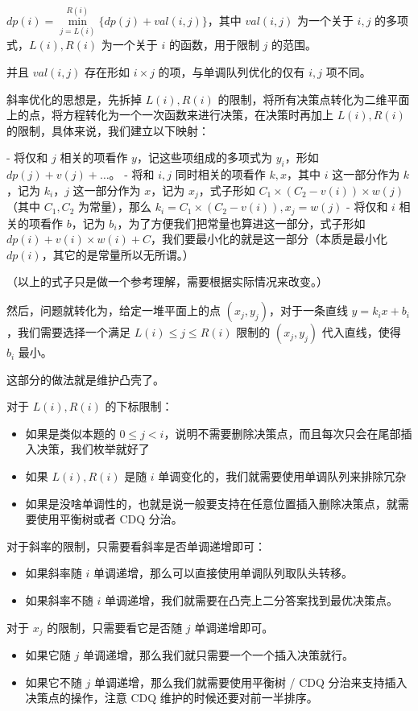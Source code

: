 \documentclass[titlepage, a4paper]{article}
\begin{document}
\begin{multicols}{2}
\begin{spacing}{0.6}
			 		$dp(i) = \min\limits_{j = L(i)}^{R(i)}\{dp(j) + val(i, j)\}$，其中 $val(i, j)$ 为一个关于 $i, j$ 的多项式，$L(i), R(i)$ 为一个关于 $i$ 的函数，用于限制 $j$ 的范围。
			 		
			 		并且 $val(i, j)$ 存在形如 $i \times j$ 的项，与单调队列优化的仅有 $i, j$ 项不同。
			 		
			 		斜率优化的思想是，先拆掉 $L(i), R(i)$ 的限制，将所有决策点转化为二维平面上的点，将方程转化为一个一次函数来进行决策，在决策时再加上 $L(i), R(i)$ 的限制，具体来说，我们建立以下映射：
			 		
			 		- 将仅和 $j$ 相关的项看作 $y$，记这些项组成的多项式为 $y_i$，形如 $dp(j) + v(j) + \dots$。
			 		- 将和 $i,j$ 同时相关的项看作 $k,x$，其中 $i$ 这一部分作为 $k$，记为 $k_i$，$j$ 这一部分作为 $x$，记为 $x_j$，式子形如 $C_1\times(C_2 - v(i)) \times w(j)$（其中 $C_1,C_2$ 为常量），那么 $k_i = C_1\times(C_2 - v(i)), x_j = w(j)$
			 		- 将仅和 $i$ 相关的项看作 $b$，记为 $b_i$，为了方便我们把常量也算进这一部分，式子形如 $dp(i) + v(i) \times w(i) + C$，我们要最小化的就是这一部分（本质是最小化 $dp(i)$，其它的是常量所以无所谓。）
			 		
			 		（以上的式子只是做一个参考理解，需要根据实际情况来改变。）
			 		
			 		然后，问题就转化为，给定一堆平面上的点 $(x_j, y_j)$，对于一条直线 $y = k_ix + b_i$，我们需要选择一个满足 $L(i) \le j \le R(i)$ 限制的 $(x_j, y_j)$ 代入直线，使得 $b_i$ 最小。
			 		
			 		这部分的做法就是维护凸壳了。
			 		
			 		对于 $L(i), R(i)$ 的下标限制：
			 		\begin{itemize}
			 			\item 如果是类似本题的 $0 \le j < i$，说明不需要删除决策点，而且每次只会在尾部插入决策，我们枚举就好了
			 			\item 如果 $L(i), R(i)$ 是随 $i$ 单调变化的，我们就需要使用单调队列来排除冗杂
			 			\item 如果是没啥单调性的，也就是说一般要支持在任意位置插入删除决策点，就需要使用平衡树或者 CDQ 分治。
			 		\end{itemize}
			 		对于斜率的限制，只需要看斜率是否单调递增即可：
			 		\begin{itemize}
			 			\item 如果斜率随 $i$ 单调递增，那么可以直接使用单调队列取队头转移。
			 			\item 如果斜率不随 $i$ 单调递增，我们就需要在凸壳上二分答案找到最优决策点。
			 		\end{itemize}
			 		对于 $x_j$ 的限制，只需要看它是否随 $j$ 单调递增即可。
			 		\begin{itemize}
			 			\item 如果它随 $j$ 单调递增，那么我们就只需要一个一个插入决策就行。
			 			\item 如果它不随 $j$ 单调递增，那么我们就需要使用平衡树 / CDQ 分治来支持插入决策点的操作，注意 CDQ 维护的时候还要对前一半排序。
			 		\end{itemize}
			 		

\end{spacing}
\end{multicols}
\end{document}
